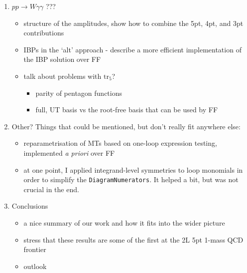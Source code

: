 \documentclass[main.tex]{subfiles}
\begin{document}
\begin{enumerate}
    \item $pp \rightarrow W \gamma \gamma$ ???
    \begin{itemize}
        \item structure of the amplitudes, show how to combine the 5pt, 4pt, and 3pt contributions
        \item IBPs in the `alt' approach - describe a more efficient implementation of the IBP solution over FF
        \item talk about problems with $\mathrm{tr}_5$?
        \begin{itemize}
            \item parity of pentagon functions
            \item full, UT basis vs the root-free basis that can be used by FF
        \end{itemize}
    \end{itemize}

    \item Other? Things that could be mentioned, but don't really fit anywhere else:
    \begin{itemize}
        \item reparametrisation of MTs based on one-loop expression testing, implemented \textit{a priori} over FF
        \item at one point, I applied integrand-level symmetries to loop monomials in order to simplify the \texttt{DiagramNumerators}. It helped a bit, but was not crucial in the end.
    \end{itemize}

    \item Conclusions
    \begin{itemize}
        \item a nice summary of our work and how it fits into the wider picture
        \item stress that these results are some of the first at the 2L 5pt 1-mass QCD frontier
        \item outlook
    \end{itemize}
\end{enumerate}
\end{document}
